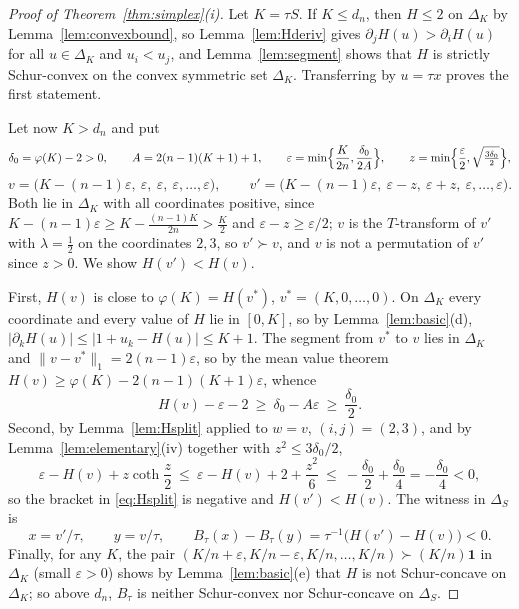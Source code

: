 \documentclass[11pt,a4paper]{article}
\theoremstyle{plain}
\theoremstyle{definition}
\newcommand{\one}{\mathbf{1}}
\newcommand{\maj}{\succ}
\newcommand{\Simp}{\Delta}
\begin{document}
\begin{proof}[Proof of Theorem~\ref{thm:simplex}(i)]
Let $K=\tau S$. If $K\le d_n$, then $H\le 2$ on $\Simp_K$ by Lemma~\ref{lem:convexbound}, so Lemma~\ref{lem:Hderiv} gives $\partial_jH(u)>\partial_iH(u)$ for all $u\in\Simp_K$ and $u_i<u_j$, and Lemma~\ref{lem:segment} shows that $H$ is strictly Schur-convex on the convex symmetric set $\Simp_K$. Transferring by $u=\tau x$ proves the first statement.

Let now $K>d_n$ and put
\begin{equation}\label{eq:simplex-pos-construction}
\delta_0=\varphi(K)-2>0,\qquad A=2(n-1)(K+1)+1,\qquad \varepsilon=\min\Bigl\{\frac{K}{2n},\frac{\delta_0}{2A}\Bigr\},\qquad z=\min\Bigl\{\frac{\varepsilon}{2},\sqrt{\tfrac{3\delta_0}{2}}\Bigr\},
\end{equation}
\[
v=\bigl(K-(n-1)\varepsilon,\ \varepsilon,\ \varepsilon,\ \varepsilon,\dots,\varepsilon\bigr),\qquad
v'=\bigl(K-(n-1)\varepsilon,\ \varepsilon-z,\ \varepsilon+z,\ \varepsilon,\dots,\varepsilon\bigr).
\]
Both lie in $\Simp_K$ with all coordinates positive, since $K-(n-1)\varepsilon\ge K-\frac{(n-1)K}{2n}>\frac K2$ and $\varepsilon-z\ge\varepsilon/2$; $v$ is the $T$-transform of $v'$ with $\lambda=\frac12$ on the coordinates $2,3$, so $v'\maj v$, and $v$ is not a permutation of $v'$ since $z>0$. We show $H(v')<H(v)$.

First, $H(v)$ is close to $\varphi(K)=H(v^\ast)$, $v^\ast=(K,0,\dots,0)$. On $\Simp_K$ every coordinate and every value of $H$ lie in $[0,K]$, so by Lemma~\ref{lem:basic}(d), $|\partial_kH(u)|\le|1+u_k-H(u)|\le K+1$. The segment from $v^\ast$ to $v$ lies in $\Simp_K$ and $\|v-v^\ast\|_1=2(n-1)\varepsilon$, so by the mean value theorem $H(v)\ge\varphi(K)-2(n-1)(K+1)\varepsilon$, whence
\begin{equation}\label{eq:Hv}
H(v)-\varepsilon-2\ \ge\ \delta_0-A\varepsilon\ \ge\ \frac{\delta_0}{2}.
\end{equation}
Second, by Lemma~\ref{lem:Hsplit} applied to $w=v$, $(i,j)=(2,3)$, and by Lemma~\ref{lem:elementary}(iv) together with $z^2\le 3\delta_0/2$,
\[
\varepsilon-H(v)+z\coth\frac z2\ \le\ \varepsilon-H(v)+2+\frac{z^2}{6}\ \le\ -\frac{\delta_0}{2}+\frac{\delta_0}{4}=-\frac{\delta_0}{4}<0,
\]
so the bracket in \eqref{eq:Hsplit} is negative and $H(v')<H(v)$. The witness in $\Simp_S$ is
\begin{equation}\label{eq:simplex-pos-witness}
x=v'/\tau,\qquad y=v/\tau,\qquad B_\tau(x)-B_\tau(y)=\tau^{-1}\bigl(H(v')-H(v)\bigr)<0 .
\end{equation}
Finally, for any $K$, the pair $(K/n+\varepsilon,K/n-\varepsilon,K/n,\dots,K/n)\maj (K/n)\one$ in $\Simp_K$ (small $\varepsilon>0$) shows by Lemma~\ref{lem:basic}(e) that $H$ is not Schur-concave on $\Simp_K$; so above $d_n$, $B_\tau$ is neither Schur-convex nor Schur-concave on $\Simp_S$.
\end{proof}
\end{document}
